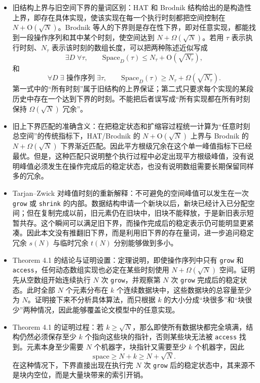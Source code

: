 \documentclass[UTF8,11pt,a4paper]{ctexart}
\newcommand{\op}[1]{\textnormal{\texttt{#1}}}
\newcommand{\Oh}{\mathrm{O}}
\begin{document}
\begin{itemize}
  \item 旧结构上界与旧空间下界的量词区别：HAT 和 Brodnik 结构给出的是构造性上界，即存在具体实现，使该实现在每一个执行时刻都把空间控制在 $N+\Oh(\sqrt{N})$。Brodnik 等人的下界则是存在性下界，即对任意实现，都能找到一段操作序列和其中某个时刻，使空间达到 $N+\Omega(\sqrt{N})$。若用 $\tau$ 表示执行时刻、$N_\tau$ 表示该时刻的数组长度，可以把两种陈述近似写成
  \[
    \exists D\;\forall\tau,\qquad
    \mathrm{Space}_D(\tau)
      \leq N_\tau+\Oh(\sqrt{N_\tau}),
  \]
  和
  \[
    \forall D\;\exists\text{ 操作序列}\;\exists\tau,\qquad
    \mathrm{Space}_D(\tau)
      \geq N_\tau+\Omega(\sqrt{N_\tau}).
  \]
  第一式中的“所有时刻”属于旧结构的上界保证；第二式只要求每个实现的某段历史中存在一个达到下界的时刻。不能把后者误写成“所有实现都在所有时刻保持 $\Omega(\sqrt{N})$ 冗余”。

  \item 旧上下界匹配的准确含义：在把稳定状态和扩缩容过程统一计算为“任意时刻总空间”的传统指标下，HAT/Brodnik 的 $N+\Oh(\sqrt{N})$ 上界与 Brodnik 的 $N+\Omega(\sqrt{N})$ 下界渐近匹配。因此平方根级冗余在这个单一峰值指标下已经最优。但是，这种匹配只说明整个执行过程中必定出现平方根级峰值，没有说明峰值必须发生在操作完成后的稳定状态，也没有说明数组需要长期保留同样多的冗余。

  \item Tarjan--Zwick 对峰值时刻的重新解释：不可避免的空间峰值可以发生在一次 \op{grow} 或 \op{shrink} 的内部。数据结构申请一个新块以后，新块已经计入已分配空间；但在复制完成以前，旧元素仍在旧块中，旧块不能释放，于是新旧表示短暂共存。这个瞬间可以满足旧下界，而操作完成后的稳定表示仍可能明显更紧凑。因此本文没有推翻旧下界，而是利用旧下界的存在量词，进一步追问稳定冗余 $s(N)$ 与临时冗余 $t(N)$ 分别能够做到多小。

  \item Theorem 4.1 的结论与证明设置：定理说明，即使操作序列中只有 \op{grow} 和 \op{access}，任何动态数组实现也必定在某些时刻使用 $N+\Omega(\sqrt{N})$ 空间。证明先从空数组开始连续执行 $N$ 次 \op{grow}，并观察第 $N$ 次 \op{grow} 完成后的稳定状态。此时全部 $N$ 个元素分布在 $k$ 个连续数据块中，这些数据块的总容量至少为 $N$。证明接下来不分析具体算法，而只根据 $k$ 的大小分成“块很多”和“块很少”两种情况，因此能够覆盖论文模型中的任意实现。

  \item Theorem 4.1 的证明过程：若 $k\geq\sqrt{N}$，那么即使所有数据块都完全填满，结构仍然必须保存至少 $k$ 个指向这些块的指针，否则某些块无法被 \op{access} 找到。元素本身至少需要 $N$ 个机器字，块指针又需要至少 $k$ 个机器字，因此
  \[
    \mathrm{space}\geq N+k\geq N+\sqrt{N}.
  \]
  在这种情况下，下界直接出现在执行完 $N$ 次 \op{grow} 后的稳定状态中，其来源不是块内空位，而是大量块带来的索引开销。


\end{itemize}
\end{document}
